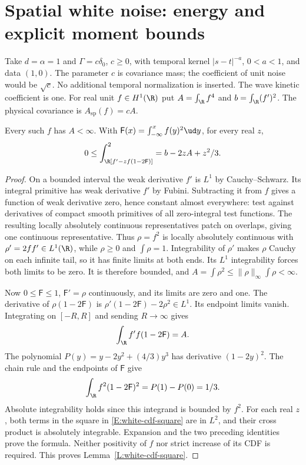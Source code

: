 \section{Spatial white noise: energy and explicit moment bounds}
\label{S:intrinsic-white-evaluation}

Take $d=\alpha=1$ and $\Gamma=c\delta_0$, $c\ge0$, with temporal kernel
$|s-t|^{-a}$, $0<a<1$, and data $(1,0)$.
The parameter $c$ is covariance mass; the coefficient of unit noise
would be $\sqrt c$. No additional temporal normalization is inserted.
The wave kinetic coefficient is one.
For real unit $f\in H^1(\R)$ put
$A=\int_\R f^4$ and $b=\int_\R(f')^2$.
The physical covariance is $A_{\mathrm{sp}}(f)=cA$.

\begin{lemma}\label{L:white-cdf-square}
  Every such $f$ has $A<\infty$.
  With $\mathsf F(x)=\int_{-\infty}^xf(y)^2\ud y$, for every real $z$,
  \begin{equation}\label{E:white-cdf-square}
    0\le\int_\R[f'-zf(1-2\mathsf F)]^2
    =b-2zA+z^2/3 .
  \end{equation}
\end{lemma}

\begin{proof}
  On a bounded interval the weak derivative $f'$ is $L^1$ by
  Cauchy--Schwarz. Its integral primitive has weak derivative $f'$
  by Fubini. Subtracting it from $f$ gives a function of weak derivative
  zero, hence constant almost everywhere: test against derivatives
  of compact smooth primitives of all zero-integral test functions.
  The resulting locally absolutely continuous representatives patch on
  overlaps, giving one continuous representative.
  Thus $\rho=f^2$ is locally absolutely continuous with
  $\rho'=2ff'\in L^1(\R)$, while $\rho\ge0$ and $\int\rho=1$.
  Integrability of $\rho'$ makes $\rho$ Cauchy on each infinite tail,
  so it has finite limits at both ends.
  Its $L^1$ integrability forces both limits to be zero.
  It is therefore bounded, and
  $A=\int\rho^2\le\|\rho\|_\infty\int\rho<\infty$.

  Now $0\le\mathsf F\le1$, $\mathsf F'=\rho$ continuously,
  and its limits are zero and one.
  The derivative of $\rho(1-2\mathsf F)$ is
  $\rho'(1-2\mathsf F)-2\rho^2\in L^1$.
  Its endpoint limits vanish.
  Integrating on $[-R,R]$ and sending $R\to\infty$ gives
  \[
    \int_\R f'f(1-2\mathsf F)=A .
  \]
  The polynomial $P(y)=y-2y^2+(4/3)y^3$ has derivative $(1-2y)^2$.
  The chain rule and the endpoints of $\mathsf F$ give
  \[
    \int_\R f^2(1-2\mathsf F)^2=P(1)-P(0)=1/3 .
  \]
  Absolute integrability holds since this integrand is bounded by $f^2$.
  For each real $z$, both terms in the square in
  \eqref{E:white-cdf-square} are in $L^2$, and their cross product is
  absolutely integrable. Expansion and the two preceding identities
  prove the formula. Neither positivity of $f$ nor strict increase
  of its CDF is required.
  This proves Lemma~\ref{L:white-cdf-square}.
\end{proof}

